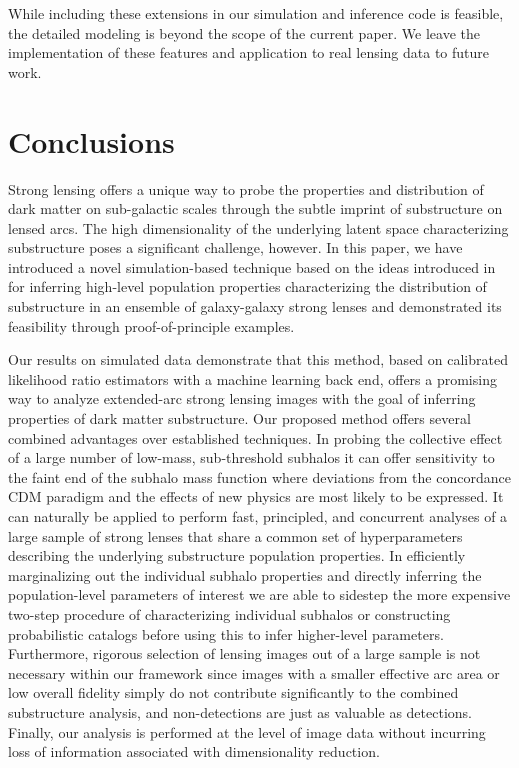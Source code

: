 \documentclass[twocolumn]{aastex62}
\begin{document}
While including these extensions in our simulation and inference code is feasible, the detailed modeling is beyond the scope of the current paper. We leave the implementation of these features and application to real lensing data to future work.

\section{Conclusions}
\label{sec:conclusions}

Strong lensing offers a unique way to probe the properties and distribution of dark matter on sub-galactic scales through the subtle imprint of substructure on lensed arcs. The high dimensionality of the underlying latent space characterizing substructure poses a significant challenge, however. In this paper, we have introduced a novel simulation-based technique based on the ideas introduced in~\citet{1805.00013,1805.00020,1805.12244,Stoye:2018ovl} for inferring high-level population properties characterizing the distribution of substructure in an ensemble of galaxy-galaxy strong lenses and demonstrated its feasibility through proof-of-principle examples.

Our results on simulated data demonstrate that this method, based on calibrated likelihood ratio estimators with a machine learning back end, offers a promising way to analyze extended-arc strong lensing images with the goal of inferring properties of dark matter substructure. Our proposed method offers several combined advantages over established techniques. In probing the collective effect of a large number of low-mass, sub-threshold subhalos it can offer sensitivity to the faint end of the subhalo mass function where deviations from the concordance CDM paradigm and the effects of new physics are most likely to be expressed. It can naturally be applied to perform fast, principled, and concurrent analyses of a large sample of strong lenses that share a common set of hyperparameters describing the underlying substructure population properties. In efficiently marginalizing out the individual subhalo properties and directly inferring the population-level parameters of interest we are able to sidestep the more expensive two-step procedure of characterizing individual subhalos or constructing probabilistic catalogs before using this to infer higher-level parameters. Furthermore, rigorous selection of lensing images out of a large sample is not necessary within our framework since images with a smaller effective arc area or low overall fidelity simply do not contribute significantly to the combined substructure analysis, and non-detections are just as valuable as detections. Finally, our analysis is performed at the level of image data without incurring loss of information associated with dimensionality reduction.
\end{document}
